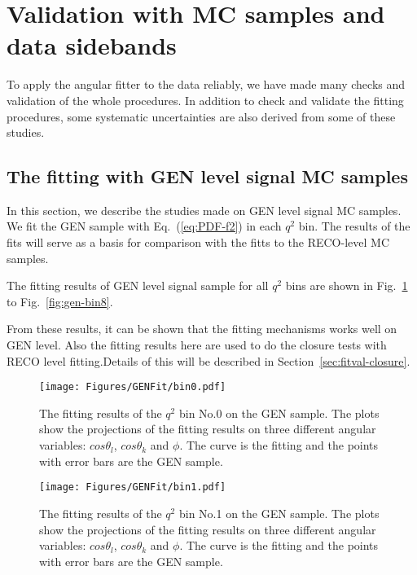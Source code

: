 \section{Validation with MC samples and data sidebands}
\label{sec:validation}

To apply the angular fitter to the data reliably, we have
made many checks and validation of the whole procedures. In addition
to check and validate the fitting procedures, some systematic
uncertainties are also derived from some of these studies.


\subsection{The fitting with GEN level signal MC samples}
\label{sec:fitval-gen}

In this section, we describe the studies made on GEN level signal MC samples.
We fit the GEN sample with Eq.~(\ref{eq:PDF-f2}) in each $q^2$ bin.
The results of the fits will serve as a basis for comparison with the fitts
to the RECO-level MC samples.

The fitting results of GEN level signal sample for all $q^2$ bins are
shown in Fig.~\ref{fig:gen-bin0} to Fig.~\ref{fig:gen-bin8}.

From these results, it can be shown that the fitting mechanisms
works well on GEN level. Also the fitting results here are used to do
the closure tests with RECO level fitting.Details of this will be
described in Section~\ref{sec:fitval-closure}.

\begin{figure}[!hbt]
  \centering
  \texttt{[image: Figures/GENFit/bin0.pdf]}
  \caption{The fitting results of the $q^2$ bin No.0 on the GEN
    sample. The plots show the projections of the fitting results on
    three different angular variables: $cos\theta_l$, $cos\theta_k$
    and $\phi$. The curve is the fitting and the points with error
    bars are the GEN  sample. } 
  \label{fig:gen-bin0}
\end{figure}

\begin{figure}[!hbt]
  \centering
  \texttt{[image: Figures/GENFit/bin1.pdf]}
  \caption{The fitting results of the $q^2$ bin No.1 on the GEN
    sample. The plots show the projections of the fitting results on
    three different angular variables: $cos\theta_l$, $cos\theta_k$
    and $\phi$. The curve is the fitting and the points with error
    bars are the GEN  sample. } 
  \label{fig:gen-bin1}
\end{figure}

